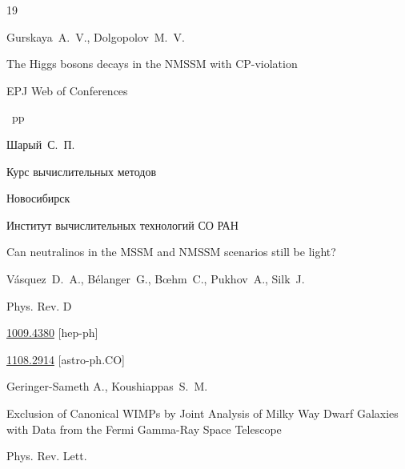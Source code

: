 \begin{thebibliography}{19}

\by Gurskaya~A.~V., Dolgopolov~M.~V.

\paper The Higgs bosons decays in the NMSSM with CP-violation

\jour EPJ Web of Conferences



~pp \nofrills





\by Шарый~С.~П.

\book Курс вычислительных методов

\publaddr Новосибирск

\publ Институт вычислительных технологий СО РАН 






\paper Can neutralinos in the MSSM and NMSSM scenarios still be light?

\by V\'asquez~D.~A., B\'elanger~G., B{\oe}hm~C., Pukhov~A., Silk~J.

\jour Phys. Rev. D 





\arxiv \href{https://arxiv.org/abs/1009.4380}{1009.4380} [hep-ph]








\arxiv \href{https://arxiv.org/abs/1108.2914}{1108.2914} [astro-ph.CO]

\by Geringer-Sameth A., Koushiappas~S.~M.

\paper Exclusion of Canonical WIMPs by Joint Analysis of Milky Way Dwarf Galaxies with Data from the Fermi Gamma-Ray Space Telescope

\jour Phys. Rev. Lett.











\end{thebibliography}



